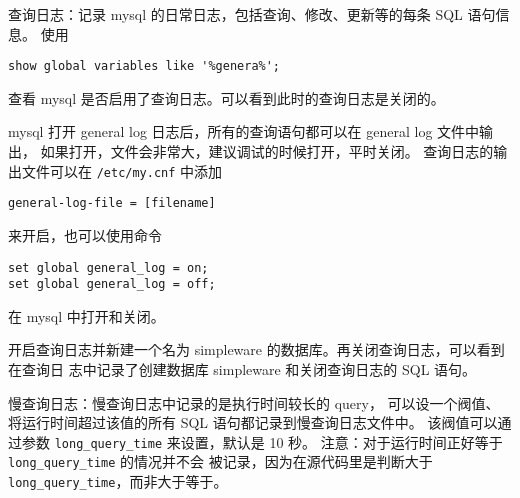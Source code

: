 查询日志：记录 mysql 的日常日志，包括查询、修改、更新等的每条 SQL 语句信息。
使用
\begin{verbatim}
show global variables like '%genera%';
\end{verbatim}
查看 mysql 是否启用了查询日志。可以看到此时的查询日志是关闭的。

mysql 打开 general log 日志后，所有的查询语句都可以在 general log 文件中输出，
如果打开，文件会非常大，建议调试的时候打开，平时关闭。
查询日志的输出文件可以在
\texttt{/etc/my.cnf} 中添加
\begin{verbatim}
general-log-file = [filename]
\end{verbatim}
来开启，也可以使用命令
\begin{verbatim}
set global general_log = on;
set global general_log = off;
\end{verbatim}
在 mysql 中打开和关闭。

开启查询日志并新建一个名为 simpleware 的数据库。再关闭查询日志，可以看到在查询日
志中记录了创建数据库 simpleware 和关闭查询日志的 SQL 语句。

慢查询日志：慢查询日志中记录的是执行时间较长的 query，
可以设一个阀值、将运行时间超过该值的所有 SQL 语句都记录到慢查询日志文件中。
该阀值可以通过参数 \texttt{long\_query\_time} 来设置，默认是 10 秒。
注意：对于运行时间正好等于 \texttt{long\_query\_time} 的情况并不会
被记录，因为在源代码里是判断大于 \texttt{long\_query\_time}，而非大于等于。

